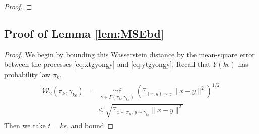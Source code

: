 \documentclass[journal,onecolumn]{IEEEtran}
\newcommand{\step}{\epsilon}
\newcommand{\CE}{\mathbb{E}}
\newcommand{\PR}{\mathbb{P}}
\newcommand{\wass}{\mathcal{W}_2}
\newcommand{\dtlaw}{\ids_{k}} %
\newcommand{\ids}{\pi}
\newcommand{\idw}{\gamma}
\newcommand{\ksp}{k,\idw}
\newcommand{\mk}{\mathcal{K}}
\newcommand{\ytlaw}{\gamma_{k\step}}
\newcommand{\wassprox}{\rho}
\newcommand{\kfv}{x} %
\newcommand{\zconst}{\xi}
\newcommand{\snum}{T}
\newcommand{\hk}{\hat{k}}
\begin{document}
{{\begin{proof}

\end{proof}}

\subsection*{Proof of Lemma \ref{lem:MSEbd}}
\begin{proof}
    We begin by bounding this Wasserstein distance by the mean-square error between the processes \eqref{eq:xtgyongy} and \eqref{eq:ytgyongy}. Recall that $Y(k\step)$ has probability law $\dtlaw$.
\begin{align*}
    \begin{split}
        \wass(\dtlaw,\ytlaw) &= \inf_{\gamma \in \Gamma(\dtlaw,\ytlaw)} \left(\CE_{(x,y)\sim \gamma}\|x-y\|^2\right)^{1/2} \\
        & \quad \leq \sqrt{\CE_{x\sim\dtlaw, \, y\sim \ytlaw }\|x-y\|^2}
    \end{split}
\end{align*}
Then we take $t = k\step$, and bound


\end{proof}}
\end{document}
